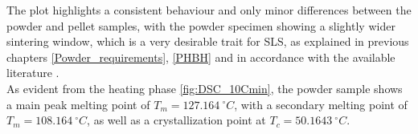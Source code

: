 \documentclass{article}
\begin{document}
%
%
%

        \clearpage

        The plot highlights a consistent behaviour  and only 
        minor differences between the powder and pellet samples, with the powder specimen showing a slightly wider 
        sintering window, which is a very desirable trait for SLS, as explained in 
        previous chapters \ref{Powder_requirements}, \ref{PHBH} and in accordance with 
        the available literature \autocites{Eraslan_PHBH_review,doi:10.1063/1.4918516,DechetMaximilianA2020OtDo}. \\    
        
        As evident from the heating phase \ref{fig:DSC_10Cmin}, the powder sample shows a main peak melting point of $T_{m} =  127.164 \ ^{\circ}C$, with 
        a secondary melting point of $T_{m} =  108.164 \ ^{\circ}C$, as well as a crystallization point at $T_{c} =  50.1643 \ ^{\circ}C$. 
\end{document}
